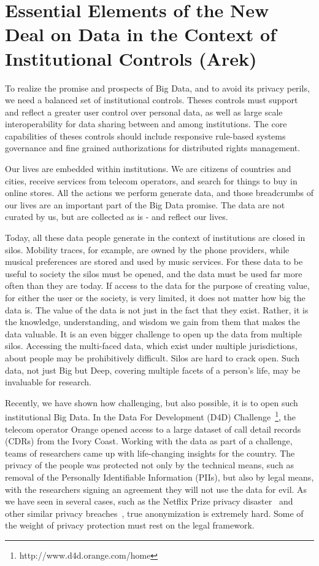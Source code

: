 \section{Essential Elements of the New Deal on Data in the Context of Institutional Controls (Arek)}

To realize the promise and prospects of Big Data, and to avoid its privacy perils, we need a balanced set of institutional controls.
Theses controls must support and reflect a greater user control over personal data, as well as large scale interoperability for data sharing between and among institutions.
The core capabilities of theses controls should include responsive rule-based systems governance and fine grained authorizations for distributed rights management.

Our lives are embedded within institutions. 
We are citizens of countries and cities, receive services from telecom operators, and search for things to buy in online stores. 
All the actions we perform generate data, and those breadcrumbs of our lives are an important part of the Big Data promise.
The data are not curated by us, but are collected as is - and reflect our lives.

Today, all these data people generate in the context of institutions are closed in silos. 
Mobility traces, for example, are owned by the phone providers, while musical preferences are stored and used by music services.
For these data to be useful to society the silos must be opened, and the data must be used far more often than they are today.
If access to the data for the purpose of creating value, for either the user or the society, is very limited, it does not matter how big the data is. 
The value of the data is not just in the fact that they exist.
Rather, it is the knowledge, understanding, and wisdom we gain from them that makes the data valuable.  
It is an even bigger challenge to open up the data from multiple silos.
Accessing the multi-faced data, which exist under multiple jurisdictions, about people may be prohibitively difficult.
Silos are hard to crack open.
Such data, not just Big but Deep, covering multiple facets of a person's life, may be invaluable for research.

Recently, we have shown how challenging, but also possible, it is to open such institutional Big Data.
In the Data For Development (D4D) Challenge~\footnote{http://www.d4d.orange.com/home}, the telecom operator Orange opened access to a large dataset of call detail records (CDRs) from the Ivory Coast.
Working with the data as part of a challenge, teams of researchers came up with life-changing insights for the country. 
The privacy of the people was protected not only by the technical means, such as removal of the Personally Identifiable Information (PIIs), but also by legal means, with the researchers signing an agreement they will not use the data for evil.
As we have seen in several cases, such as the Netflix Prize privacy disaster~\cite{narayanan2008robust} and other similar privacy breaches~\cite{sweeney2000simple}, true anonymization is extremely hard.  Some of the weight of privacy protection must rest on the legal framework.

